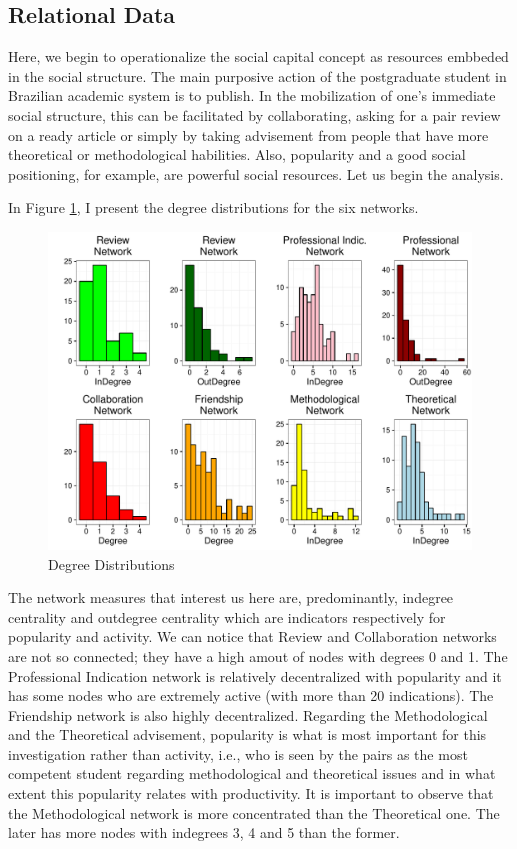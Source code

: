 \documentclass[a4paper, 12pt, openright, oneside, article, german, french, brazil, english]{abntex2}
\begin{document}
\subsection{Relational Data}

Here, we begin to operationalize the social capital concept as resources embbeded in the social structure. The main purposive action of the postgraduate student in Brazilian academic system is to publish. In the mobilization of one's immediate social structure, this can be facilitated by collaborating, asking for a pair review on a ready article or simply by taking advisement from people that have more theoretical or methodological habilities. Also, popularity and a good social positioning, for example, are powerful social resources. Let us begin the analysis.

In Figure \ref{degree-distributions}, I present the degree distributions for the six networks.

\begin{figure}[htb]
	\centering
	\caption{Degree Distributions}
	\label{degree-distributions}
	\includegraphics[scale=0.7]{degree_distributions.pdf}
\end{figure}

The network measures that interest us here are, predominantly, indegree centrality and outdegree centrality which are indicators respectively for popularity and activity. We can notice that Review and Collaboration networks are not so connected; they have a high amout of nodes with degrees 0 and 1. The Professional Indication network is relatively decentralized with popularity and it has some nodes who are extremely active (with more than 20 indications). The Friendship network is also highly decentralized. Regarding the Methodological and the Theoretical advisement, popularity is what is most important for this investigation rather than activity, i.e., who is seen by the pairs as the most competent student regarding methodological and theoretical issues and in what extent this popularity relates with productivity. It is important to observe that the Methodological network is more concentrated than the Theoretical one. The later has more nodes with indegrees 3, 4 and 5 than the former. 
\end{document}

